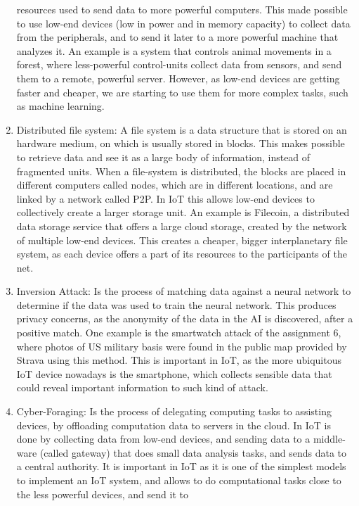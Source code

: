 \documentclass[acmsmall, screen,timestamp,nonacm]{acmart}
\begin{document}
\begin{enumerate}
		resources used to
		send data to more powerful computers. This made possible to use
		low-end devices (low in power and in memory capacity) to collect data from the peripherals, and to send it
		later to a more powerful machine that analyzes it. An example is a
		system that controls animal movements in a forest, where less-powerful
		control-units collect data from sensors, and send them to a remote,
		powerful server. However, as low-end devices are getting faster and
		cheaper, we are starting to use them for more complex tasks, such as
		machine learning.
	\item Distributed file system: A file system is a data structure that is stored on an hardware
		medium, on which is usually stored in blocks. This makes possible to
		retrieve data and see it as a large body of information, instead of
		fragmented units. When a file-system is distributed, the blocks are
		placed in different computers called nodes, which are in different
		locations, and are linked by a
		network called P2P. In IoT this allows low-end devices to collectively
		create a larger storage unit. An example is Filecoin, a distributed data
		storage service that offers
		a large cloud storage, created by the network of multiple low-end
		devices. This creates a cheaper, bigger interplanetary file system, as
		each device offers a part of its resources to the participants of the
		net.
	\item Inversion Attack: Is the process of matching data against a neural network to determine
		if the data was used to train the neural network. This produces privacy
		concerns, as the anonymity of the data in the AI is discovered, after
		a positive match. One example is the smartwatch attack of the assignment
		6, where photos of US military basis were found in the public map
		provided by Strava using this method. This is important in IoT, as the
		more ubiquitous IoT device nowadays is the smartphone, which collects
		sensible data that could reveal important information to such kind of
		attack. 
	\item Cyber-Foraging: Is the process of delegating computing tasks to assisting devices, by
		offloading computation data to servers in the cloud. In IoT is done
		 by collecting data from low-end devices, and sending data to a
		 middle-ware (called gateway)
		 that does small data analysis tasks, and sends data to a central
		 authority. It is important in IoT as it is
		 one of the simplest models to implement an IoT system, and allows to
		 do computational tasks close to the less powerful devices, and send it to 

\end{enumerate}
\end{document}
